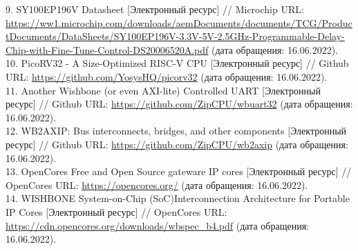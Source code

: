 9. SY100EP196V Datasheet [Электронный ресурс] // Microchip URL: \url{https://ww1.microchip.com/downloads/aemDocuments/documents/TCG/ProductDocuments/DataSheets/SY100EP196V-3.3V-5V-2.5GHz-Programmable-Delay-Chip-with-Fine-Tune-Control-DS20006520A.pdf} (дата обращения: 16.06.2022).\\
10. PicoRV32 - A Size-Optimized RISC-V CPU [Электронный ресурс] // Github URL: \url{https://github.com/YosysHQ/picorv32} (дата обращения: 16.06.2022).\\
11. Another Wishbone (or even AXI-lite) Controlled UART [Электронный ресурс] // Github URL: \url{https://github.com/ZipCPU/wbuart32} (дата обращения: 16.06.2022).\\
12. WB2AXIP: Bus interconnects, bridges, and other components [Электронный ресурс] // Github URL: \url{https://github.com/ZipCPU/wb2axip} (дата обращения: 16.06.2022).\\
13. OpenCores Free and Open Source gateware IP cores [Электронный ресурс] // OpenCores URL: \url{https://opencores.org/} (дата обращения: 16.06.2022).\\
14. WISHBONE System-on-Chip (SoC)Interconnection Architecture for Portable IP Cores [Электронный ресурс] // OpenCores URL: \url{https://cdn.opencores.org/downloads/wbspec\_b4.pdf} (дата обращения: 16.06.2022). \\
